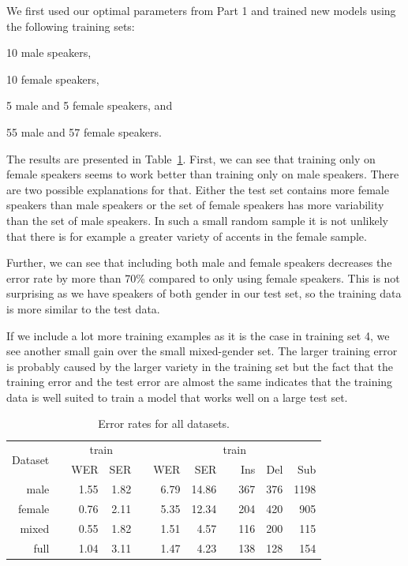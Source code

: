 \documentclass[twocolumn, 11pt]{article}
\begin{document}
We first used our optimal parameters from Part 1 and trained new models using
the following training sets:
\begin{inparaenum}[1)]
  \item 10 male speakers,
  \item 10 female speakers,
  \item 5 male and 5 female speakers, and
  \item 55 male and 57 female speakers.
\end{inparaenum}

The results are presented in Table~\ref{tab:wer-all}\@. First, we can see that training only
on female speakers seems to work better than training only on male speakers.
There are two possible explanations for that. Either the test set contains
more female speakers than male speakers or the set of female speakers has more
variability than the set of male speakers. In such a small random sample it is
not unlikely that there is for example a greater variety of accents in the
female sample.

Further, we can see that including both male and female speakers decreases the
error rate by more than 70\% compared to only using female speakers. This is not
surprising as we have speakers of both gender in our test set, so the training
data is more similar to the test data.

If we include a lot more training examples as it is the case in training set 4,
we see another small gain over the small mixed-gender set. The larger training
error is probably caused by the larger variety in the training set but the fact
that the training error and the test error are almost the same indicates that
the training data is well suited to train a model that works well on a large
test set.

\begin{table}\centering
  \begin{tabular}{@{}rcrrcrrcrrr@{}}\toprule%
    \multirow{2}{*}{Dataset} & \phantom{a} & \multicolumn{2}{c}{train}
    & \phantom{a} & \multicolumn{6}{c}{train} \\
    \cmidrule{3-4} \cmidrule{6-11}
    && WER & SER && WER & SER && Ins & Del & Sub\\ \midrule%
    male && 1.55 & 1.82 && 6.79 & 14.86 && 367 & 376 & 1198\\
    female && 0.76 & 2.11 && 5.35 & 12.34 && 204 & 420 & 905\\
    mixed && 0.55 & 1.82 && 1.51 & 4.57 && 116 & 200 & 115\\
    full && 1.04 & 3.11 && 1.47 & 4.23 && 138 & 128 & 154\\
    \bottomrule
  \end{tabular}
  \caption{Error rates for all datasets.}\label{tab:wer-all}
\end{table}
\end{document}
